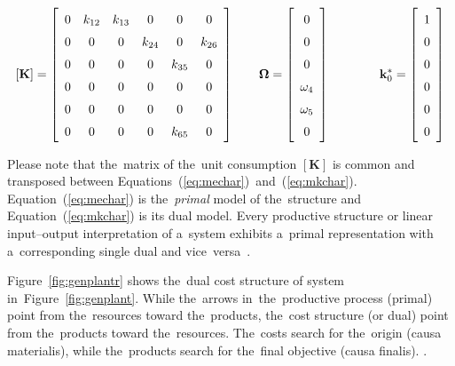 \documentclass[energies,article,accept,moreauthors,pdftex]{Definitions/mdpi}
\newcommand{\vm}[1]{\ensuremath{\mathbf{#1}}}
\begin{document}
\begin{equation*}
    \def\arraystretch{1.5}
    \left[\vm{K}\right]=\left[\begin{array}{cccccc}
    0 & k_{12} & k_{13} & 0 & 0 & 0 \\
    0 & 0 & 0 & k_{24} & 0 & k_{26} \\
    0 & 0 & 0 & 0 & k_{35} & 0 \\
    0 & 0 & 0 & 0 & 0 & 0 \\
    0 & 0 & 0 & 0 & 0 & 0 \\
    0 & 0 & 0 & 0 & k_{65} & 0
    \end{array}
    \right]
    \qquad
    \vm{\Omega}=\left[\begin{array}{c}
    0 \\
    0 \\
    0 \\
    \omega_4 \\
    \omega_5 \\
    0
    \end{array}
    \right]
    \qquad
    \qquad
    \vm{k}_0^*=\left[\begin{array}{c}
    1 \\
    0 \\
    0 \\
    0 \\
    0 \\
    0
    \end{array}
    \right]
\end{equation*}

Please note that the~matrix of the~unit consumption $\left[\vm{K}\right]$ is common and transposed between Equations~(\ref{eq:mechar})~and~(\ref{eq:mkchar}). Equation~(\ref{eq:mechar}) is the~\emph{primal} model of the~structure and Equation~(\ref{eq:mkchar}) is its dual model. Every productive structure or linear input–output interpretation of a~system exhibits a~primal representation with a~corresponding single dual and vice~versa~\cite{Boyd2004}.

Figure~\ref{fig:genplantr} shows the~dual cost structure of system in~Figure~\ref{fig:genplant}. While the~arrows in~the~productive process (primal) point from the~resources toward the~products, the~cost structure (or dual) point from the~products toward the~resources. The~costs search for the~origin (causa materialis), while the~products search for the~final objective (causa finalis). \cite{Valero1990d}.
\end{document}
